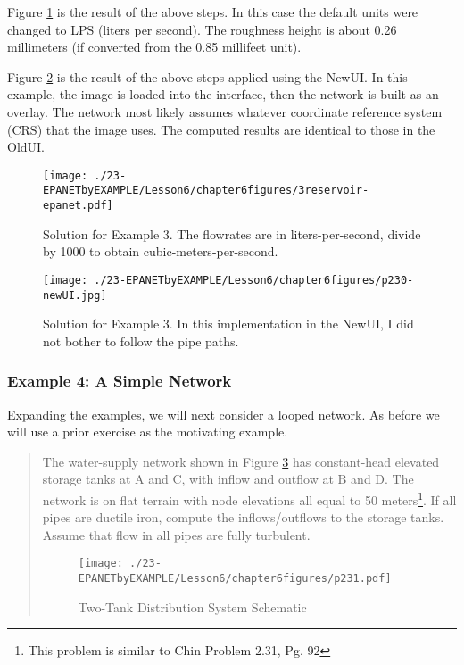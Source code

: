 Figure \ref{fig:3reservoir-epanet} is the result of the above steps.   In this case the default units were changed to LPS (liters per second).  The roughness height is about 0.26 millimeters (if converted from the 0.85 millifeet unit).

Figure \ref{fig:p230-newUI} is the result of the above steps applied using the NewUI.  
In this example, the image is loaded into the interface, then the network is built as an overlay. 
The network most likely assumes whatever coordinate reference system (CRS) that the image uses.
The computed results are identical to those in the OldUI.

\newpage
\begin{figure}[h!] %
   \centering
   \texttt{[image: ./23-EPANETbyEXAMPLE/Lesson6/chapter6figures/3reservoir-epanet.pdf]} 
   \caption{Solution for Example 3. The flowrates are in liters-per-second, divide by 1000 to obtain cubic-meters-per-second.}
   \label{fig:3reservoir-epanet}
\end{figure}

\begin{figure}[h!] %
   \centering
   \texttt{[image: ./23-EPANETbyEXAMPLE/Lesson6/chapter6figures/p230-newUI.jpg]} 
   \caption{Solution for Example 3.  In this implementation in the NewUI, I did not bother to follow the pipe paths.}
   \label{fig:p230-newUI}
\end{figure}
\clearpage
\subsubsection{Example 4: A Simple Network}
Expanding the examples, we will next consider a looped network.   As before we will use a prior exercise as the motivating example.

\begin{quote}
The water-supply network shown in Figure \ref{fig:p231} has constant-head elevated storage tanks at A and C, with inflow and outflow at B and D.  The network is on flat terrain with node elevations all equal to 50 meters\footnote{This problem is similar to Chin Problem 2.31, Pg. 92}.  If all pipes are ductile iron, compute the inflows/outflows to the storage tanks.   Assume that flow in all pipes are fully turbulent.

\begin{figure}[htbp] %
   \centering
   \texttt{[image: ./23-EPANETbyEXAMPLE/Lesson6/chapter6figures/p231.pdf]} 
   \caption{Two-Tank Distribution System Schematic}
   \label{fig:p231}
\end{figure}
\end{quote}

